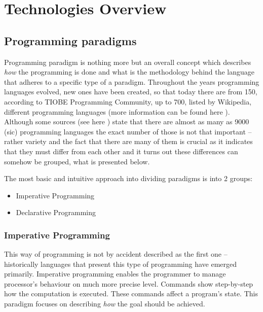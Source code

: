 \section{Technologies Overview}
\subsection{Programming paradigms}
    Programming paradigm is nothing more but an overall concept which describes \textit{how} the programming is done and what is the methodology behind the language that adheres to a specific type of a paradigm. Throughout the years programming languages evolved, new ones have been created, so that today there are from 150, according to TIOBE Programming Community, up to 700, listed by Wikipedia, different programming languages (more information can be found here \cite{numberOfProgrammingLanguages}). Although some sources (see here \cite{numberOfProgrammingLanguages_hopl_info}) state that there are almost as many as 9000 (sic) programming languages the exact number of those is not that important -- rather variety and the fact that there are many of them is crucial as it indicates that they must differ from each other and it turns out these differences can somehow be grouped, what is presented below.
    
    The most basic and intuitive approach into dividing paradigms is into 2 groups:
    \begin{itemize}
        \item Imperative Programming
        \item Declarative Programming
    \end{itemize}
    
    \subsubsection{Imperative Programming}
    This way of programming is not by accident described as the first one -- historically languages that present this type of programming have emerged primarily. Imperative programming enables the programmer to manage processor's behaviour on much more precise level. Commands show step-by-step how the computation is executed. These commands affect a program's state. This paradigm focuses on describing \textit{how} the goal should be achieved.
    
